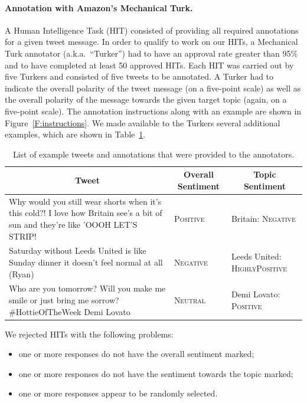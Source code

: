 \documentclass[11pt,letterpaper]{article}
\begin{document}
\paragraph{Annotation with Amazon's Mechanical Turk.} A Human
Intelligence Task (HIT) consisted of providing all required
annotations for a given tweet message.
In order to qualify to work on our HITs, a Mechanical Turk annotator
(a.k.a.\ ``Turker'') had to have an approval rate greater than 95\%
and to have completed at least 50 approved HITs. Each HIT was carried
out by five Turkers and consisted of five tweets to be annotated. A Turker had to indicate the overall polarity of the
tweet message (on a five-point scale) as well as the overall
polarity of the message towards the given target topic (again, on a
five-point scale). The annotation instructions along with an
example are shown in Figure~\ref{F:instructions}.  We made
available to the Turkers several additional examples, which are shown
in Table~\ref{T:annotation-examples}.

\begin{table}[t!]
  \centering
  \resizebox{\textwidth}{!} {
  \begin{tabular}{|p{9cm}|p{1.5cm}|p{5.5cm}|}
    \hline
    \multicolumn{1}{|c|}{\bf Tweet} & \multicolumn{1}{c|}{\bf Overall Sentiment} & \multicolumn{1}{c|}{\bf Topic Sentiment} \\
    \hline\hline
    Why would you still wear shorts when it's this cold?! I love how Britain see's a bit of sun and they're like 'OOOH LET'S STRIP! &	\textsc{Positive} &	Britain: \textsc{Negative} \\
    \hline
    Saturday without Leeds United is like Sunday dinner it doesn't feel normal at all (Ryan)	& \textsc{Negative}	& Leeds United: \textsc{HighlyPositive} \\
    \hline
    Who are you tomorrow? Will you make me smile or just bring me sorrow? \#HottieOfTheWeek Demi Lovato	& \textsc{Neutral}	& Demi Lovato: \textsc{Positive} \\
    \hline
  \end{tabular}
  }
  \caption{List of example tweets and annotations that were provided to the annotators.}
  \label{T:annotation-examples}
\end{table}

We rejected HITs with the following problems:

\begin{itemize}
\item one or more responses do not have the overall sentiment marked;
\item one or more responses do not have the sentiment towards the
  topic marked;
\item one or more responses appear to be randomly selected.
\end{itemize}
\end{document}

